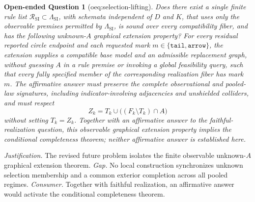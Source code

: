 \documentclass{article}
\newtheorem{openendedquestion}{Open-ended Question}
\begin{document}
\begin{openendedquestion}[oeq:selection-lifting]\label{oeq:selection-lifting}
Does there exist a single finite rule list \(\mathcal R_{\mathrm{SI}}\subset\Lambda_{\mathrm{SI}}\), with schemata independent of \(D\) and \(K\), that uses only the observable premises permitted by \(\Lambda_{\mathrm{SI}}\), is sound over every compatibility fiber, and has the following unknown-\(A\) graphical extension property? For every residual reported circle endpoint and each requested mark \(m\in\{\mathtt{tail},\mathtt{arrow}\}\), the extension supplies a compatible base model and an admissible replacement graph, without guessing \(A\) in a rule premise or invoking a global feasibility query, such that every fully specified member of the corresponding realization fiber has mark \(m\). The affirmative answer must preserve the complete observational and pooled-law signatures, including indicator-involving adjacencies and unshielded colliders, and must respect
\[
 Z_k=T_k\cup\bigl((F_k\setminus T_k)\cap A\bigr)
\]
without setting \(T_k=Z_k\). Together with an affirmative answer to the faithful-realization question, this observable graphical extension property implies the conditional completeness theorem; neither affirmative answer is established here.
\end{openendedquestion}
\par\smallskip\noindent \textit{Justification.} The revised future problem isolates the finite observable unknown-\(A\) graphical extension theorem. \textit{Gap.} No local construction synchronizes unknown selection membership and a common exterior completion across all pooled regimes. \textit{Consumer.} Together with faithful realization, an affirmative answer would activate the conditional completeness theorem.
\end{document}
